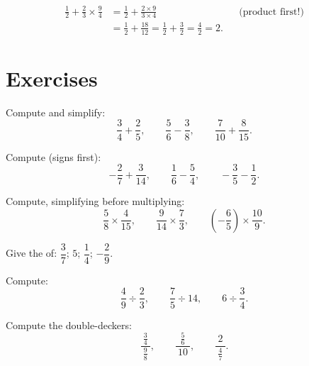 \begin{example}\label{ex:g8:fractions:mixed}
\begin{align*}
\frac12 + \frac{2}{3} \times \frac{9}{4}
&= \frac12 + \frac{2 \times 9}{3 \times 4}
&& \text{(product first!)} \\
&= \frac12 + \frac{18}{12} = \frac12 + \frac32
= \frac{4}{2} = 2 .
\end{align*}
\end{example}

\section{Exercises}

\begin{exercise}[$\star$]\label{exo:g8:fractions:1}
Compute and simplify:
\[
\frac{3}{4} + \frac{2}{5}, \qquad
\frac{5}{6} - \frac{3}{8}, \qquad
\frac{7}{10} + \frac{8}{15} .
\]
\end{exercise}

\begin{exercise}[$\star$]\label{exo:g8:fractions:2}
Compute (signs first):
\[
-\frac{2}{7} + \frac{3}{14}, \qquad
\frac{1}{6} - \frac{5}{4}, \qquad
-\frac{3}{5} - \frac{1}{2} .
\]
\end{exercise}

\begin{exercise}[$\star$]\label{exo:g8:fractions:3}
Compute, simplifying before multiplying:
\[
\frac{5}{8} \times \frac{4}{15}, \qquad
\frac{9}{14} \times \frac{7}{3}, \qquad
\left(-\frac{6}{5}\right) \times \frac{10}{9} .
\]
\end{exercise}

\begin{exercise}[$\star$]\label{exo:g8:fractions:4}
Give the  of: $\dfrac{3}{7}$; \quad $5$; \quad
$\dfrac{1}{4}$; \quad $-\dfrac{2}{9}$.
\end{exercise}

\begin{exercise}[$\star$]\label{exo:g8:fractions:5}
Compute:
\[
\frac{4}{9} \div \frac{2}{3}, \qquad
\frac{7}{5} \div 14, \qquad
6 \div \frac{3}{4} .
\]
\end{exercise}

\begin{exercise}[$\star$]\label{exo:g8:fractions:6}
Compute the double-deckers:
\[
\frac{\ \frac{3}{4}\ }{\ \frac{9}{8}\ },
\qquad
\frac{\ \frac{5}{6}\ }{\ 10\ },
\qquad
\frac{\ 2\ }{\ \frac{4}{7}\ } .
\]
\end{exercise}

